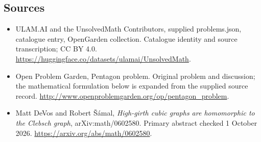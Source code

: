 \documentclass[11pt,a4paper]{article}
\begin{document}
\subsection{Sources}
\begin{itemize}
\item[S1] ULAM.AI and the UnsolvedMath Contributors, supplied problems.json, catalogue entry, OpenGarden collection. Catalogue identity and source transcription; CC BY 4.0.
\url{https://huggingface.co/datasets/ulamai/UnsolvedMath}.
\item[S2] Open Problem Garden, Pentagon problem. Original problem and discussion; the mathematical formulation below is expanded from the supplied source record.
\url{http://www.openproblemgarden.org/op/pentagon_problem}.
\item[R1] Matt DeVos and Robert Šámal, \emph{High-girth cubic graphs
are homomorphic to the Clebsch graph}, arXiv:math/0602580.
Primary abstract checked 1 October 2026.
\url{https://arxiv.org/abs/math/0602580}.
\end{itemize}
\end{document}
